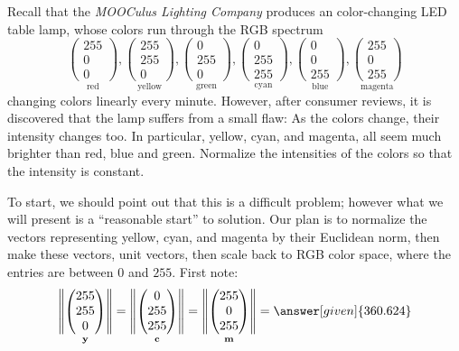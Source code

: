 \documentclass{ximera}
\begin{document}
\begin{example}
  Recall that the \textit{MOOCulus Lighting Company} produces an color-changing LED table lamp, whose colors run through the RGB spectrum
    \[
    \underset{\text{red}}{\begin{pmatrix}255\\0\\0\end{pmatrix}},
    \underset{\text{yellow}}{\begin{pmatrix}255\\255\\0\end{pmatrix}},
    \underset{\text{green}}{\begin{pmatrix}0\\255\\0\end{pmatrix}},
    \underset{\text{cyan}}{\begin{pmatrix}0\\255\\255\end{pmatrix}},
    \underset{\text{blue}}{\begin{pmatrix}0\\0\\255\end{pmatrix}},
    \underset{\text{magenta}}{\begin{pmatrix}255\\0\\255\end{pmatrix}}
    \]
    changing colors linearly every minute. However, after consumer
    reviews, it is discovered that the lamp suffers from a small flaw:
    As the colors change, their intensity changes too. In particular,
    yellow, cyan, and magenta, all seem much brighter than red, blue
    and green. Normalize the intensities of the colors so that the
    intensity is constant.
    \begin{explanation}
      To start, we should point out that this is a difficult problem;
      however what we will present is a ``reasonable start'' to
      solution.  Our plan is to normalize the vectors representing
      yellow, cyan, and magenta by their Euclidean norm, then make
      these vectors, unit vectors, then scale back to RGB color space,
      where the entries are between $0$ and $255$. First note:
   \[
   \underset{\vec{y}}{\left\|\begin{pmatrix}255\\255\\0\end{pmatrix}\right\|} =  \underset{\vec{c}}{\left\|\begin{pmatrix}0\\255\\255\end{pmatrix}\right\|} =  \underset{\vec{m}}{\left\|\begin{pmatrix}255\\0\\255\end{pmatrix}\right\|} = \answer[given]{360.624}
\]
\end{explanation}
\end{example}
\end{document}
